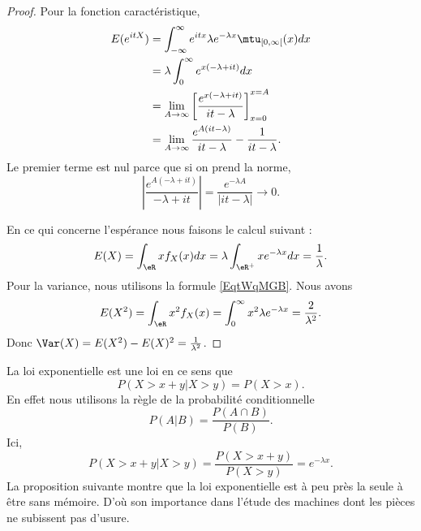 \begin{proof}    
    Pour la fonction caractéristique,
    \begin{subequations}
        \begin{align}
            E( e^{itX})&=\int_{-\infty}^{\infty} e^{it x}\lambda e^{-\lambda x}\mtu_{\mathopen[ 0 , \infty [}(x)dx\\
            &=\lambda\int_0^{\infty} e^{x(-\lambda+it)}dx\\
            &=\lim_{A\to\infty}\left[  \frac{  e^{x(-\lambda+it)} }{ it-\lambda } \right]_{x=0}^{x=A}\\
            &=\lim_{A\to \infty}\frac{  e^{A(it-\lambda)} }{ it-\lambda }-\frac{1}{ it-\lambda }.
        \end{align}
    \end{subequations}
    Le premier terme est nul parce que si on prend la norme,
    \begin{equation}
        \left| \frac{  e^{A(-\lambda+it)} }{ -\lambda+it } \right| =\frac{  e^{-\lambda A} }{ | it-\lambda | }\to 0.
    \end{equation}

    En ce qui concerne l'espérance nous faisons le calcul suivant :
    \begin{equation}
        E(X)=\int_{\eR}xf_X(x)dx=\lambda\int_{\eR^+}x e^{-\lambda x}dx=\frac{1}{ \lambda }.
    \end{equation}
    Pour la variance, nous utilisons la formule \eqref{EqtWqMGB}. Nous avons
    \begin{equation}
        E(X^2)=\int_{\eR}x^2f_X(x)=\int_0^{\infty}x^2\lambda e^{-\lambda x}=\frac{ 2 }{ \lambda^2 }.
    \end{equation}
    Donc \( \Var(X)=E(X^2)-E(X)^2=\frac{1}{ \lambda^2 }\).
\end{proof}

La loi exponentielle est une loi  en ce sens que
\begin{equation}
    P(X>x+y|X>y)=P(X>x).
\end{equation}
En effet nous utilisons la règle de la probabilité conditionnelle
\begin{equation}
    P(A|B)=\frac{ P(A\cap B) }{ P(B) }.
\end{equation}
Ici,
\begin{equation}
    P(X>x+y|X>y)=\frac{ P(X>x+y) }{ P(X>y) }= e^{-\lambda x}.
\end{equation}
La proposition suivante montre que la loi exponentielle est à peu près la seule à être sans mémoire. D'où son importance dans l'étude des machines dont les pièces ne subissent pas d'usure.

